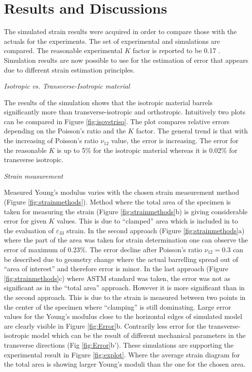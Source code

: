\documentclass[review]{elsarticle}
\begin{document}
\section{Results and Discussions}
The simulated strain results were acquired in order to compare those with the
actuals for the experiments. The set of experimental and simulations are
compared. The reasonable experimental $K$ factor is reported to be 0.17
\cite{Toftegaard199x`9849}. Simulation results are now possible to use for the
estimation of error that appears due to different strain estimation principles.

\begin{description}
\item{\textit{Isotropic vs. Transverse-Isotropic material}}
\end{description}
The results of the simulation shows that the isotropic material barrels
significantly more than transverse-isotropic and orthotropic. 
Intuitively two plots can be compared in Figure \ref{fig:isovstriso}. The plot
compares relative errors depending on the Poisson's ratio and the $K$
factor. The general trend is that with the increasing of Poisson's ratio
$\nu_{12}$ value, the error is increasing. The error for the reasonable $K$ is
up to 5\% for the isotropic material whereas it is 0.02\% for transverse
isotropic. 
\begin{description}
\item{\textit{Strain measurement}}
\end{description}
Measured Young's modulus varies with the chosen strain measurement method
(Figure \ref{fig:strainmethods}). Method where the total area of the specimen is
taken for measuring the strain (Figure \ref{fig:strainmethods}b) is giving
considerable error for given $K$ values. This is due to ``clamped'' area which
is included in to the evaluation of $\varepsilon_{33}$ strain. In the second 
approach (Figure \ref{fig:strainmethods}a) where the part of the area was taken
for strain determination one can observe the error of maximum of $0.23\%$. The error decline after Poisson's
ratio $\nu_{12}=0.3$ can be described due to geometry change where the actual
barrelling spread out of ``area of interest'' and therefore error is minor.
In the last approach (Figure \ref{fig:strainmethods}c) where ASTM standard was
taken, the error was not as significant as in the ``total area'' approach. 
However it is more significant than in the second approach. This is due to the
strain is measured between two points in the center of the specimen where
``clamping'' is still dominating. Large error values for the Young's modulus
close to the horizontal edges of simulated model are clearly visible in
Figure \ref{fig:Error}b. Contrarily less error for the transverse-isotropic
model which can be the result of different mechanical parameters in the
transverse directions (Fig \ref{fig:Error}b'). These simulations are supporting
the experimental result in Figure \ref{fig:explot}. Where the
average strain diagram for the total area is showing larger Young's moduli than
the one for the chosen area.
\end{document}
